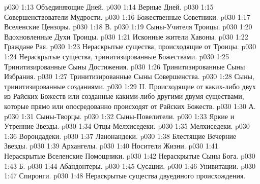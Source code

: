 \vs p030 1:13 \bibnobreakspace Объединяющие Дней.
\vs p030 1:14 \bibnobreakspace Верные Дней.
\vs p030 1:15 \bibnobreakspace Совершенствователи Мудрости.
\vs p030 1:16 \bibnobreakspace Божественные Советники.
\vs p030 1:17 \bibnobreakspace Вселенские Цензоры.
\vs p030 1:18 \pc В. 
\vs p030 1:19 \pc {}\bibnobreakspace Сыны\hyp{}Учителя Троицы.
\vs p030 1:20 \bibnobreakspace Вдохновленные Духи Троицы.
\vs p030 1:21 \bibnobreakspace Исконные жители Хавоны.
\vs p030 1:22 \bibnobreakspace Граждане Рая.
\vs p030 1:23 \bibnobreakspace Нераскрытые существа, происходящие от Троицы.
\vs p030 1:24 \bibnobreakspace Нераскрытые существа, тринитизированные Божествами.
\vs p030 1:25 \bibnobreakspace Тринитизированные Сыны Достижения.
\vs p030 1:26 \bibnobreakspace Тринитизированные Сыны Избрания.
\vs p030 1:27 \bibnobreakspace Тринитизированные Сыны Совершенства.
\vs p030 1:28 \bibnobreakspace Сыны, тринитизированные созданиями.
\vs p030 1:29 \pc II.  Происходящие от каких\hyp{}либо двух из Райских Божеств или созданные какими\hyp{}либо другими двумя существами, которые прямо или опосредованно происходят от Райских Божеств.
\vs p030 1:30 \pc А. 
\vs p030 1:31 \bibnobreakspace Сыны\hyp{}Творцы.
\vs p030 1:32 \bibnobreakspace Сыны\hyp{}Повелители.
\vs p030 1:33 \bibnobreakspace Яркие и Утренние Звезды.
\vs p030 1:34 \bibnobreakspace Отцы\hyp{}Мелхиседеки.
\vs p030 1:35 \bibnobreakspace Мелхиседеки.
\vs p030 1:36 \bibnobreakspace Ворондадеки.
\vs p030 1:37 \bibnobreakspace Ланонандеки.
\vs p030 1:38 \bibnobreakspace Блестящие Вечерние Звезды.
\vs p030 1:39 \bibnobreakspace Архангелы.
\vs p030 1:40 \bibnobreakspace Носители Жизни.
\vs p030 1:41 \bibnobreakspace Нераскрытые Вселенские Помощники.
\vs p030 1:42 \bibnobreakspace Нераскрытые Сыны Бога.
\vs p030 1:43 \pc Б. 
\vs p030 1:44 \bibnobreakspace Абандонтеры.
\vs p030 1:45 \bibnobreakspace Сусации.
\vs p030 1:46 \bibnobreakspace Унивитации.
\vs p030 1:47 \bibnobreakspace Спиронги.
\vs p030 1:48 \bibnobreakspace Нераскрытые существа двуединого происхождения.
